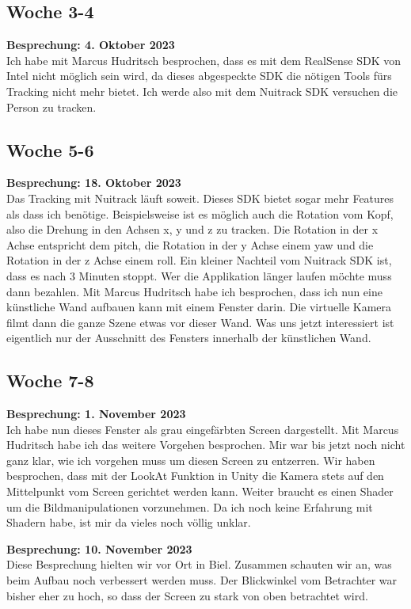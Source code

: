 \subsection{Woche 3-4}
\textbf{Besprechung: 4. Oktober 2023} \\
Ich habe mit Marcus Hudritsch besprochen, dass es mit dem RealSense SDK von Intel nicht möglich sein wird, da dieses abgespeckte SDK die nötigen Tools fürs Tracking nicht mehr bietet. Ich werde also mit dem Nuitrack SDK versuchen die Person zu tracken.

\subsection{Woche 5-6}
\textbf{Besprechung: 18. Oktober 2023} \\
Das Tracking mit Nuitrack läuft soweit. Dieses SDK bietet sogar mehr Features als dass ich benötige. Beispielsweise ist es m\"oglich auch die Rotation vom Kopf, also die Drehung in den Achsen x, y und z zu tracken. Die Rotation in der x Achse entspricht dem pitch, die Rotation in der y Achse einem yaw und die Rotation in der z Achse einem roll.
Ein kleiner Nachteil vom Nuitrack SDK ist, dass es nach 3 Minuten stoppt. Wer die Applikation länger laufen möchte muss dann bezahlen.
Mit Marcus Hudritsch habe ich besprochen, dass ich nun eine künstliche Wand aufbauen kann mit einem Fenster darin. Die virtuelle Kamera filmt dann die ganze Szene etwas vor dieser Wand. Was uns jetzt interessiert ist eigentlich nur der Ausschnitt des Fensters innerhalb der k\"unstlichen Wand.

\subsection{Woche 7-8}
\textbf{Besprechung: 1. November 2023} \\
Ich habe nun dieses Fenster als grau eingefärbten Screen dargestellt. Mit Marcus Hudritsch habe ich das weitere Vorgehen besprochen. Mir war bis jetzt noch nicht ganz klar, wie ich vorgehen muss um diesen Screen zu entzerren.
Wir haben besprochen, dass mit der LookAt Funktion in Unity die Kamera stets auf den Mittelpunkt vom Screen gerichtet werden kann. Weiter braucht es einen Shader um die Bildmanipulationen vorzunehmen. Da ich noch keine Erfahrung mit Shadern habe, ist mir da vieles noch völlig unklar.

\textbf{Besprechung: 10. November 2023} \\
Diese Besprechung hielten wir vor Ort in Biel. Zusammen schauten wir an, was beim Aufbau noch verbessert werden muss. Der Blickwinkel vom Betrachter war bisher eher zu hoch, so dass der Screen zu stark von oben betrachtet wird.

